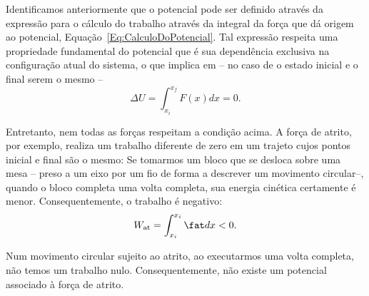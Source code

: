 Identificamos anteriormente que o potencial pode ser definido através da expressão para o cálculo do trabalho através da integral da força que dá origem ao potencial, Equação~\eqref{Eq:CalculoDoPotencial}. Tal expressão respeita uma propriedade fundamental do potencial que é sua dependência exclusiva na configuração atual do sistema, o que implica em -- no caso de o estado inicial e o final serem o mesmo --
\begin{equation}
  \Delta U = \int_{x_i}^{x_f} F(x) dx = 0.
\end{equation}

Entretanto, nem todas as forças respeitam a condição acima. A força de atrito, por exemplo, realiza um trabalho diferente de zero em um trajeto cujos pontos inicial e final são o mesmo: Se tomarmos um bloco que se desloca sobre uma mesa -- preso a um eixo por um fio de forma a descrever um movimento circular--, quando o bloco completa uma volta completa, sua energia cinética certamente é menor. Consequentemente, o trabalho é negativo:
\begin{equation}
  W_{\rm{at}} = \int_{x_i}^{x_i} \fat dx < 0.
\end{equation}

\begin{marginfigure}[-5cm]
\centering
{}
\caption{Num movimento circular sujeito ao atrito, ao executarmos uma volta completa, não temos um trabalho nulo. Consequentemente, não existe um potencial associado à força de atrito.}
\end{marginfigure}

